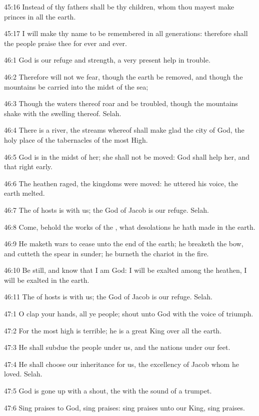 45:16 Instead of thy fathers shall be thy children, whom thou mayest make princes in all the earth.

45:17 I will make thy name to be remembered in all generations: therefore shall the people praise thee for ever and ever.



46:1 God is our refuge and strength, a very present help in trouble.

46:2 Therefore will not we fear, though the earth be removed, and though the mountains be carried into the midst of the sea;

46:3 Though the waters thereof roar and be troubled, though the mountains shake with the swelling thereof. Selah.

46:4 There is a river, the streams whereof shall make glad the city of God, the holy place of the tabernacles of the most High.

46:5 God is in the midst of her; she shall not be moved: God shall help her, and that right early.

46:6 The heathen raged, the kingdoms were moved: he uttered his voice, the earth melted.

46:7 The \LORD of hosts is with us; the God of Jacob is our refuge.  Selah.

46:8 Come, behold the works of the \LORD, what desolations he hath made in the earth.

46:9 He maketh wars to cease unto the end of the earth; he breaketh the bow, and cutteth the spear in sunder; he burneth the chariot in the fire.

46:10 Be still, and know that I am God: I will be exalted among the heathen, I will be exalted in the earth.

46:11 The \LORD of hosts is with us; the God of Jacob is our refuge.  Selah.



47:1 O clap your hands, all ye people; shout unto God with the voice of triumph.

47:2 For the \LORD most high is terrible; he is a great King over all the earth.

47:3 He shall subdue the people under us, and the nations under our feet.

47:4 He shall choose our inheritance for us, the excellency of Jacob whom he loved. Selah.

47:5 God is gone up with a shout, the \LORD with the sound of a trumpet.

47:6 Sing praises to God, sing praises: sing praises unto our King, sing praises.

